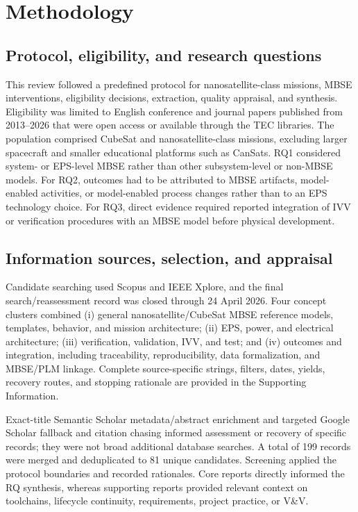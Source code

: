 \documentclass[alpha-refs]{wiley-article}
\begin{document}
\section{Methodology}

\subsection{Protocol, eligibility, and research questions}
This review followed a predefined protocol for nanosatellite-class missions, MBSE interventions, eligibility decisions, extraction, quality appraisal, and synthesis.  Eligibility was limited to English conference and journal papers published from 2013--2026 that were open access or available through the TEC libraries.  The population comprised CubeSat and nanosatellite-class missions, excluding larger spacecraft and smaller educational platforms such as CanSats.  RQ1 considered system- or EPS-level MBSE rather than other subsystem-level or non-MBSE models.  For RQ2, outcomes had to be attributed to MBSE artifacts, model-enabled activities, or model-enabled process changes rather than to an EPS technology choice.  For RQ3, direct evidence required reported integration of IVV or verification procedures with an MBSE model before physical development.

\subsection{Information sources, selection, and appraisal}
Candidate searching used Scopus and IEEE Xplore, and the final search/reassessment record was closed through 24 April 2026.  Four concept clusters combined (i) general nanosatellite/CubeSat MBSE reference models, templates, behavior, and mission architecture; (ii) EPS, power, and electrical architecture; (iii) verification, validation, IVV, and test; and (iv) outcomes and integration, including traceability, reproducibility, data formalization, and MBSE/PLM linkage.  Complete source-specific strings, filters, dates, yields, recovery routes, and stopping rationale are provided in the Supporting Information.

Exact-title Semantic Scholar metadata/abstract enrichment and targeted Google Scholar fallback and citation chasing informed assessment or recovery of specific records; they were not broad additional database searches.  A total of 199 records were merged and deduplicated to 81 unique candidates.  Screening applied the protocol boundaries and recorded rationales.  Core reports directly informed the RQ synthesis, whereas supporting reports provided relevant context on toolchains, lifecycle continuity, requirements, project practice, or V\&V.
\end{document}
